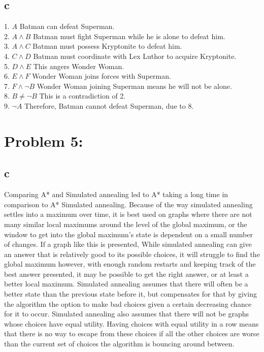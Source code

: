 \documentclass[11pt, oneside]{article}   	%
\begin{document}
\begin{flushleft}
\subsection*{c}
1. $A$ Batman can defeat Superman. \\
2. $A \wedge B$ Batman must fight Superman while he is alone to defeat him. \\
3. $A \wedge C$ Batman must possess Kryptonite to defeat him. \\
4. $C \wedge D$ Batman must coordinate with Lex Luthor to acquire Kryptonite. \\
5. $D \wedge E$ This angers Wonder Woman. \\
6. $E \wedge F$ Wonder Woman joins forces with Superman. \\
7. $F \wedge \neg B$ Wonder Woman joining Superman means he will not be alone. \\
8. $B \neq \neg B$ This is a contradiction of 2. \\
9. $\neg A$ Therefore, Batman cannot defeat Superman, due to 8.\\\medskip

\section*{Problem 5:}
\subsection*{c}
Comparing A* and Simulated annealing led to A* taking a long time in comparison to A* Simulated annealing. Because of the way simulated annealing settles into a maximum over time, it is best used on graphs where there are not many similar local maximums around the level of the global maximum, or the window to get into the global maximum's state is dependent on a small number of changes. If a graph like this is presented, While simulated annealing can give an answer that is relatively good to its possible choices, it will struggle to find the global maximum however, with enough random restarts and keeping track of the best answer presented, it may be possible to get the right answer, or at least a better local maximum.
Simulated annealing assumes that there will often be a better state than the previous state before it, but compensates for that by giving the algorithm the option to make bad choices given a certain decreasing chance for it to occur. Simulated annealing also assumes that there will not be graphs whose choices have equal utility. Having choices with equal utility in a row means that there is no way to escape from these choices if all the other choices are worse than the current set of choices the algorithm is bouncing around between.


\end{flushleft}
\end{document}
